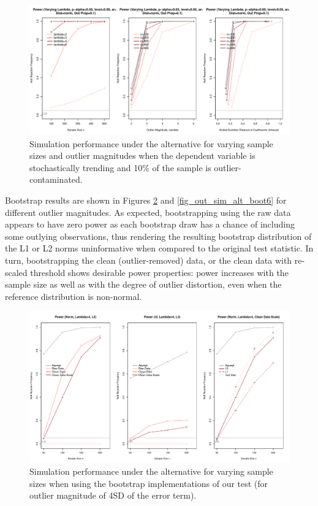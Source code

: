 \documentclass[11pt, letterpaper]{article}
\numberwithin{algorithm}{section}
\numberwithin{assumption}{section}
\numberwithin{lemma}{section}
\numberwithin{theorem}{section}
\numberwithin{corollary}{section}
\numberwithin{remark}{section}
\numberwithin{equation}{section}
\numberwithin{figure}{section}
\numberwithin{table}{section}
\begin{document}
\begin{figure}[!htbp]  %
\centering
\includegraphics[width = \textwidth]{alt_ar1_nreg5_palpha0.05_distnorm_outprop0.1.pdf}
\caption{Simulation performance under the alternative for varying sample sizes and outlier magnitudes when the dependent variable is stochastically trending and 10\% of the sample is outlier-contaminated.}
\label{fig_out_sim_alt2}
\end{figure}

Bootstrap results are shown in Figures \ref{fig_out_sim_alt_boot4} and \ref{fig_out_sim_alt_boot6} for different outlier magnitudes. As expected, bootstrapping using the raw data appears to have zero power as each bootstrap draw has a chance of including some outlying observations, thus rendering the resulting bootstrap distribution of the L1 or L2 norms uninformative when compared to the original test statistic. In turn, bootstrapping the clean (outlier-removed) data, or the clean data with re-scaled threshold shows desirable power properties: power increases with the sample size as well as with the degree of outlier distortion, even when the reference distribution is non-normal.

\begin{figure}[!htbp]  %
\centering
\includegraphics[width = \textwidth]{boot_alt_lambda4.pdf}
\caption{Simulation performance under the alternative for varying sample sizes when using the bootstrap implementations of our test (for outlier magnitude of 4SD of the error term).}
\label{fig_out_sim_alt_boot4}
\end{figure}
\end{document}
